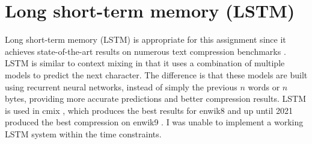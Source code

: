 \documentclass[a4paper, 11pt]{article}
\numberwithin{equation}{section}
\begin{document}
\section{Long short-term memory (LSTM)}
Long short-term memory (LSTM) is appropriate for this assignment since it achieves state-of-the-art 
results on numerous text compression benchmarks \cite{cmix,TextBenchmark}. 
LSTM is similar to context mixing in that it uses a combination of multiple models to predict the next character. 
The difference is that these models are built using recurrent neural networks, instead of 
simply the previous $n$ words or $n$ bytes, providing more accurate predictions and better compression results. 
LSTM is used in cmix \cite{cmix}, which produces the best results for enwik8 and up until 2021 \cite{bellard2021lossless} 
produced the best compression on enwik9 \cite{TextBenchmark}. 
I was unable to implement a working LSTM system within the time constraints. 




\end{document}
